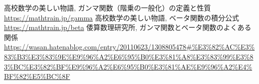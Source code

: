\documentclass[a4paper,12pt,uplatex,dvipdfmx]{jsarticle}
\begin{document}
\begin{thebibliography}{9}
    高校数学の美しい物語, ガンマ関数（階乗の一般化）の定義と性質 \\
    \url{https://mathtrain.jp/gamma}
    高校数学の美しい物語, ベータ関数の積分公式 \\
    \url{https://mathtrain.jp/beta}
    倭算数理研究所, ガンマ関数とベータ関数のよくある関係 \\
    \url{https://wasan.hatenablog.com/entry/20110623/1308805478#%E3%82%AC%E3%83%B3%E3%83%9E%E9%96%A2%E6%95%B0%E3%81%A8%E3%83%99%E3%83%BC%E3%82%BF%E9%96%A2%E6%95%B0%E3%81%AE%E9%96%A2%E4%BF%82%E5%BC%8F}
\end{thebibliography}
\end{document}

